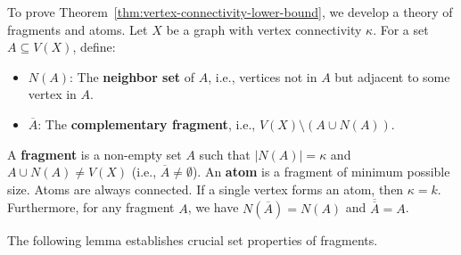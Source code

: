 \documentclass[12pt,a4paper,openany]{book}
\begin{document}
To prove Theorem~\ref{thm:vertex-connectivity-lower-bound}, we develop a theory of fragments and atoms. Let $X$ be a graph with vertex connectivity $\kappa$.
For a set $A \subseteq V(X)$, define:
\begin{itemize}
    \item $N(A)$: The \textbf{neighbor set} of $A$, i.e., vertices not in $A$ but adjacent to some vertex in $A$.
    \item $\overline{A}$: The \textbf{complementary fragment}, i.e., $V(X) \setminus (A \cup N(A))$.
\end{itemize}
A \textbf{fragment} is a non-empty set $A$ such that $|N(A)| = \kappa$ and $A \cup N(A) \neq V(X)$ (i.e., $\overline{A} \neq \emptyset$). An \textbf{atom} is a fragment of minimum possible size. Atoms are always connected. If a single vertex forms an atom, then $\kappa = k$. Furthermore, for any fragment $A$, we have $N(\overline{A}) = N(A)$ and $\overline{\overline{A}} = A$.

The following lemma establishes crucial set properties of fragments.
\end{document}
